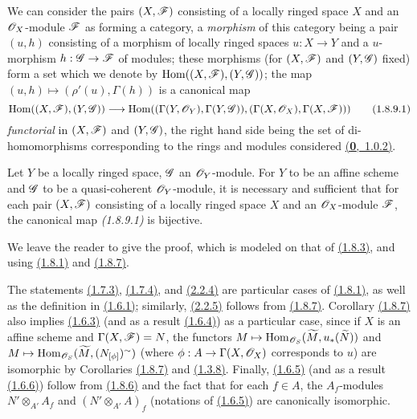 \begin{env}[1.8.9]
\label{env-1.1.8.9}
We can consider the pairs $(X,\mathscr{F})$ consisting of a locally ringed space $X$ and an
$\mathscr{O}_X$-module $\mathscr{F}$ as forming a category, a {\em morphism} of this category being a
pair $(u,h)$ consisting of a morphism of locally ringed spaces
$u:X\to Y$ and a $u$-morphism $h:\mathscr{G}\to\mathscr{F}$ of modules; these morphisms (for
$(X,\mathscr{F})$ and $(Y,\mathscr{G})$ fixed) form a set which we denote by
${\mathop{\mathrm{Hom}}\nolimits}((X,\mathscr{F}),(Y,\mathscr{G}))$; the map $(u,h)\mapsto(\rho'(u),\Gamma(h))$ is a canonical
map
\[
  {\mathop{\mathrm{Hom}}\nolimits}((X,\mathscr{F}),(Y,\mathscr{G}))
  \longrightarrow{\mathop{\mathrm{Hom}}\nolimits}((\Gamma(Y,\mathscr{O}_Y),\Gamma(Y,\mathscr{G})),(\Gamma(X,\mathscr{O}_X),\Gamma(X,\mathscr{F})))
  \tag{1.8.9.1}
\]
{\em functorial} in $(X,\mathscr{F})$ and $(Y,\mathscr{G})$, the right hand side being the set of
di-homomorphisms corresponding to the rings and modules considered \hyperref[env-0.1.0.2]{(\textbf{0},~1.0.2)}.
\end{env}

\begin{cor}[1.8.10]
\label{cor-1.1.8.10}
Let $Y$ be a locally ringed space, $\mathscr{G}$ an $\mathscr{O}_Y$-module. For $Y$ to be an affine scheme
and $\mathscr{G}$ to be a quasi-coherent $\mathscr{O}_Y$-module, it is necessary and sufficient that for
each pair $(X,\mathscr{F})$ consisting of a locally ringed space $X$ and an $\mathscr{O}_X$-module
$\mathscr{F}$, the canonical map {\em (1.8.9.1)} is bijective.
\end{cor}

We leave the reader to give the proof, which is modeled on that of \hyperref[cor-1.1.8.3]{(1.8.3)}, and
using \hyperref[prop-1.1.8.1]{(1.8.1)} and \hyperref[cor-1.1.8.7]{(1.8.7)}.

\begin{rmk}[1.8.11]
\label{rmk-1.1.8.11}
The statements \hyperref[thm-1.1.7.3]{(1.7.3)}, \hyperref[cor-1.1.7.4]{(1.7.4)}, and \hyperref[prop-1.2.2.4]{(2.2.4)} are particular
cases of \hyperref[prop-1.1.8.1]{(1.8.1)}, as well as the definition in \hyperref[env-1.1.6.1]{(1.6.1)}; similarly,
\hyperref[prop-1.2.2.5]{(2.2.5)} follows from \hyperref[cor-1.1.8.7]{(1.8.7)}. Corollary \hyperref[cor-1.1.8.7]{(1.8.7)} also implies
\hyperref[prop-1.1.6.3]{(1.6.3)} (and as a result \hyperref[cor-1.1.6.4]{(1.6.4)}) as a particular case, since if $X$ is
an affine scheme and $\Gamma(X,\mathscr{F})=N$, the functors
$M\mapsto{\mathop{\mathrm{Hom}}\nolimits}_{\mathscr{O}_S}(\widetilde{M},u_*(\widetilde{N}))$ and
$M\mapsto{\mathop{\mathrm{Hom}}\nolimits}_{\mathscr{O}_S}(\widetilde{M},(N_{[\phi]})^\sim)$ (where $\phi:A\to\Gamma(X,\mathscr{O}_X)$
corresponds to $u$) are isomorphic by Corollaries \hyperref[cor-1.1.8.7]{(1.8.7)} and \hyperref[cor-1.1.3.8]{(1.3.8)}. Finally,
\hyperref[prop-1.1.6.5]{(1.6.5)} (and as a result \hyperref[cor-1.1.6.6]{(1.6.6)}) follow from \hyperref[cor-1.1.8.6]{(1.8.6)} and the
fact that for each $f\in A$, the $A_f$-modules $N'\otimes_{A'}A_f$ and $(N'\otimes_{A'}A)_f$
(notations of \hyperref[prop-1.1.6.5]{(1.6.5)}) are canonically isomorphic.
\end{rmk}

